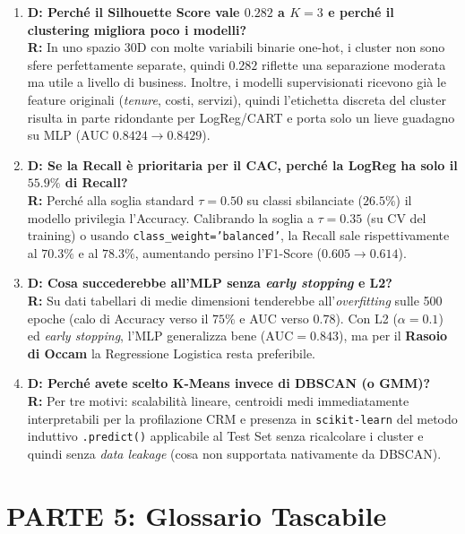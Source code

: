 \documentclass[11pt, a4paper]{article}
\begin{document}
\begin{enumerate}
    \item \textbf{D: Perché il Silhouette Score vale $0.282$ a $K=3$ e perché il clustering migliora poco i modelli?}\\
    \textbf{R:} In uno spazio 30D con molte variabili binarie one-hot, i cluster non sono sfere perfettamente separate, quindi $0.282$ riflette una separazione moderata ma utile a livello di business. Inoltre, i modelli supervisionati ricevono già le feature originali (\textit{tenure}, costi, servizi), quindi l'etichetta discreta del cluster risulta in parte ridondante per LogReg/CART e porta solo un lieve guadagno su MLP ($\text{AUC } 0.8424 \rightarrow 0.8429$).

    \item \textbf{D: Se la Recall è prioritaria per il CAC, perché la LogReg ha solo il $55.9\%$ di Recall?}\\
    \textbf{R:} Perché alla soglia standard $\tau=0.50$ su classi sbilanciate ($26.5\%$) il modello privilegia l'Accuracy. Calibrando la soglia a $\tau=0.35$ (su CV del training) o usando \texttt{class\_weight='balanced'}, la Recall sale rispettivamente al $70.3\%$ e al $78.3\%$, aumentando persino l'F1-Score ($0.605 \rightarrow 0.614$).

    \item \textbf{D: Cosa succederebbe all'MLP senza \textit{early stopping} e L2?}\\
    \textbf{R:} Su dati tabellari di medie dimensioni tenderebbe all'\textit{overfitting} sulle 500 epoche (calo di Accuracy verso il $75\%$ e AUC verso $0.78$). Con L2 ($\alpha=0.1$) ed \textit{early stopping}, l'MLP generalizza bene ($\text{AUC}=0.843$), ma per il \textbf{Rasoio di Occam} la Regressione Logistica resta preferibile.

    \item \textbf{D: Perché avete scelto K-Means invece di DBSCAN (o GMM)?}\\
    \textbf{R:} Per tre motivi: scalabilità lineare, centroidi medi immediatamente interpretabili per la profilazione CRM e presenza in \texttt{scikit-learn} del metodo induttivo \texttt{.predict()} applicabile al Test Set senza ricalcolare i cluster e quindi senza \textit{data leakage} (cosa non supportata nativamente da DBSCAN).
\end{enumerate}

\section*{PARTE 5: Glossario Tascabile}
\end{document}
